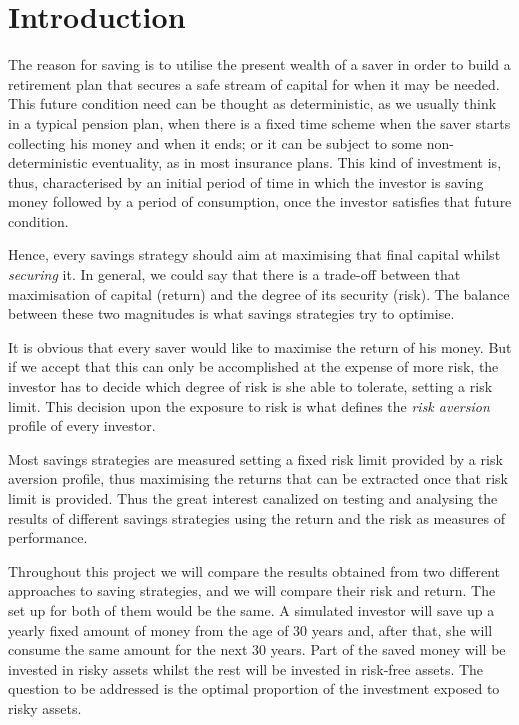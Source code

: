 \section{Introduction}

The reason for saving is to utilise the present wealth of a saver in order to build a retirement plan that secures a safe stream of capital for when it may be needed. This future condition need can be thought as deterministic, as we usually think in a typical pension plan, when there is a fixed time scheme when the saver starts collecting his money and when it ends; or it can be subject to some non-deterministic eventuality, as in most insurance plans. This kind of investment is, thus, characterised by an initial period of time in which the investor is saving money followed by a period of consumption, once the investor satisfies that future condition.

Hence, every savings strategy should aim at maximising that final capital whilst \textit{securing} it. In general, we could say that there is a trade-off between that maximisation of capital (return) and the degree of its security (risk). The balance between these two magnitudes is what savings strategies try to optimise.

It is obvious that every saver would like to maximise the return of his money. But if we accept that this can only be accomplished at the expense of more risk, the investor has to decide which degree of risk is she able to tolerate, setting a risk limit. This decision upon the exposure to risk is what defines the \textit{risk aversion} profile of every investor.

Most savings strategies are measured setting a fixed risk limit provided by a risk aversion profile, thus maximising the returns that can be extracted once that risk limit is provided. Thus the great interest canalized on testing and analysing the results of different savings strategies using the return and the risk as measures of performance.


Throughout this project we will compare the results obtained from two different approaches to saving strategies, and we will compare their risk and return. The set up for both of them would be the same. A simulated investor will save up a yearly fixed amount of money from the age of 30 years and, after that, she will consume the same amount for the next 30 years. Part of the saved money will be invested in risky assets whilst the rest will be invested in risk-free assets. The question to be addressed is the optimal proportion of the investment exposed to risky assets.

